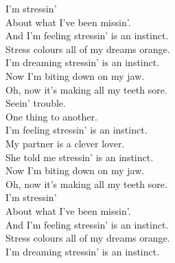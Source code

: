 
\label{album:oddments}









I'm stressin' \\
About what I've been missin'. \\
And I'm feeling stressin' is an instinct. \\
Stress colours all of my dreams orange. \\
I'm dreaming stressin' is an instinct. \\
Now I'm biting down on my jaw. \\
Oh, now it's making all my teeth sore. \\

Seein' trouble. \\
One thing to another. \\
I'm feeling stressin' is an instinct. \\
My partner is a clever lover. \\
She told me stressin' is an instinct. \\
Now I'm biting down on my jaw. \\
Oh, now it's making all my teeth sore. \\

I'm stressin' \\
About what I've been missin'. \\
And I'm feeling stressin' is an instinct. \\
Stress colours all of my dreams orange. \\
I'm dreaming stressin' is an instinct. \\





